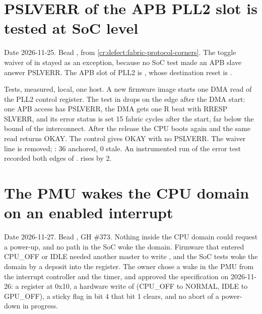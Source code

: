 \section{PSLVERR of the APB PLL2 slot is tested at SoC level}\label{cr:defect:pll2-pslverr-untested}

\begin{record}

Date 2026-11-25. Bead , from \cref{cr:defect:fabric-protocol-corners}. The toggle waiver of  in  stayed as an exception, because no SoC test made an APB slave answer PSLVERR. The APB slot of PLL2 is , whose destination reset is .

\end{record}

\begin{record}

Tests, measured, local, one host. A new firmware image  starts one DMA read of the PLL2 control register. The test  in  drops  on the edge after the DMA start: one APB access has PSLVERR, the DMA gets one R beat with RRESP SLVERR, and its error status is set 15 fabric cycles after the start, far below the bound of the interconnect. After the release the CPU boots again and the same read returns OKAY. The control  gives OKAY with no PSLVERR. The waiver line is removed; : 36 anchored, 0 stale. An instrumented run of the error test recorded both edges of .  rises by 2.

\end{record}

\section{The PMU wakes the CPU domain on an enabled interrupt}\label{cr:defect:pmu-irq-wake}

\begin{record}

Date 2026-11-27. Bead , GH \#373. Nothing inside the CPU domain could request a power-up, and no path in the SoC woke the domain. Firmware that entered CPU\_OFF or IDLE needed another master to write , and the SoC tests woke the domain by a deposit into the register. The owner chose a wake in the PMU from the interrupt controller and the timer, and approved the specification on 2026-11-26: a register  at 0x10, a hardware write of  (CPU\_OFF to NORMAL, IDLE to GPU\_OFF), a sticky flag in  bit 4 that  bit 1 clears, and no abort of a power-down in progress.

\end{record}

